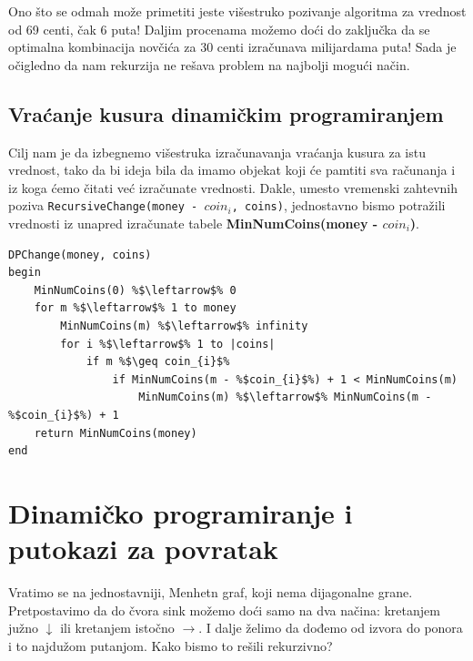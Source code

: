 Ono što se odmah može primetiti jeste višestruko pozivanje algoritma za vrednost od 69 centi, čak 6 puta! Daljim procenama možemo doći do zaključka da se optimalna kombinacija novčića za 30 centi izračunava milijardama puta! Sada je očigledno da nam rekurzija ne rešava problem na najbolji mogući način.

\subsection{Vraćanje kusura dinamičkim programiranjem}

Cilj nam je da izbegnemo višestruka izračunavanja  vraćanja kusura za istu vrednost, tako da bi ideja bila da imamo objekat koji će pamtiti sva računanja i iz koga ćemo čitati već izračunate vrednosti. Dakle, umesto vremenski zahtevnih poziva  
\texttt{RecursiveChange(money - $coin_{i}$, coins)}, jednostavno bismo potražili vrednosti iz unapred izračunate tabele \textbf{MinNumCoins(money - $coin_{i}$)}.

\begin{lstlisting}
DPChange(money, coins)
begin
    MinNumCoins(0) %$\leftarrow$% 0 
    for m %$\leftarrow$% 1 to money
        MinNumCoins(m) %$\leftarrow$% infinity
        for i %$\leftarrow$% 1 to |coins|
            if m %$\geq coin_{i}$%
                if MinNumCoins(m - %$coin_{i}$%) + 1 < MinNumCoins(m)
                    MinNumCoins(m) %$\leftarrow$% MinNumCoins(m - %$coin_{i}$%) + 1
	return MinNumCoins(money)
end
\end{lstlisting}


\section{Dinamičko programiranje i putokazi za povratak}

Vratimo se na jednostavniji, Menhetn graf, koji nema dijagonalne grane. Pretpostavimo da do čvora sink možemo doći samo na dva načina: kretanjem južno $\downarrow$ ili kretanjem istočno $\rightarrow$. I dalje želimo da dođemo od izvora do ponora i to najdužom putanjom. Kako bismo to rešili rekurzivno? 

